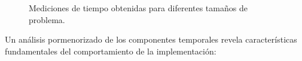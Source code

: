         \begin{figure}[H]
            \centering
            \caption{Mediciones de tiempo obtenidas para diferentes tamaños de problema.}
            \label{fig:daxpy_mean_times_256}
        \end{figure}        

        Un análisis pormenorizado de los componentes temporales revela características fundamentales del comportamiento de la implementación:
        
